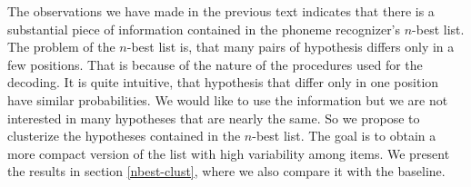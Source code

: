 \par
The observations we have made in the previous text indicates that there is a substantial piece of information contained in the phoneme recognizer's $n$-best list.
The problem of the $n$-best list is, that many pairs of hypothesis differs only in a few positions.
That is because of the nature of the procedures used for the decoding.
It is quite intuitive, that hypothesis that differ only in one position have similar probabilities.
We would like to use the information but we are not interested in many hypotheses that are nearly the same.
So we propose to clusterize the hypotheses contained in the $n$-best list.
The goal is to obtain a more compact version of the list with high variability among items.
We present the results in section \ref{nbest-clust}, where we also compare it with the baseline.